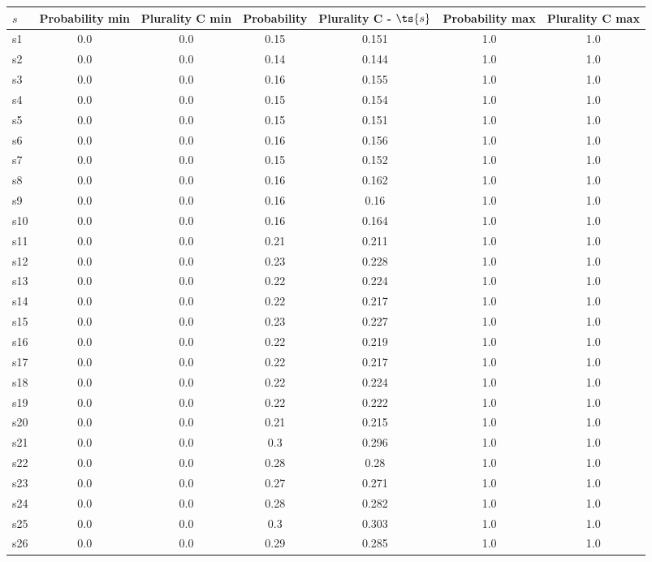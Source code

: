 \documentclass{article}
\begin{document}
\noindent\begin{tabular}{|l|c|c|c|c|c|c|}
\hline
$s$& Probability min & Plurality C min & Probability & Plurality C - $\ts{s}$ & Probability max & Plurality C max\\
\hline
s1 &0.0 & 0.0 & 0.15 & 0.151 & 1.0 & 1.0\\
\hline
s2 &0.0 & 0.0 & 0.14 & 0.144 & 1.0 & 1.0\\
\hline
s3 &0.0 & 0.0 & 0.16 & 0.155 & 1.0 & 1.0\\
\hline
s4 &0.0 & 0.0 & 0.15 & 0.154 & 1.0 & 1.0\\
\hline
s5 &0.0 & 0.0 & 0.15 & 0.151 & 1.0 & 1.0\\
\hline
s6 &0.0 & 0.0 & 0.16 & 0.156 & 1.0 & 1.0\\
\hline
s7 &0.0 & 0.0 & 0.15 & 0.152 & 1.0 & 1.0\\
\hline
s8 &0.0 & 0.0 & 0.16 & 0.162 & 1.0 & 1.0\\
\hline
s9 &0.0 & 0.0 & 0.16 & 0.16 & 1.0 & 1.0\\
\hline
s10 &0.0 & 0.0 & 0.16 & 0.164 & 1.0 & 1.0\\
\hline
s11 &0.0 & 0.0 & 0.21 & 0.211 & 1.0 & 1.0\\
\hline
s12 &0.0 & 0.0 & 0.23 & 0.228 & 1.0 & 1.0\\
\hline
s13 &0.0 & 0.0 & 0.22 & 0.224 & 1.0 & 1.0\\
\hline
s14 &0.0 & 0.0 & 0.22 & 0.217 & 1.0 & 1.0\\
\hline
s15 &0.0 & 0.0 & 0.23 & 0.227 & 1.0 & 1.0\\
\hline
s16 &0.0 & 0.0 & 0.22 & 0.219 & 1.0 & 1.0\\
\hline
s17 &0.0 & 0.0 & 0.22 & 0.217 & 1.0 & 1.0\\
\hline
s18 &0.0 & 0.0 & 0.22 & 0.224 & 1.0 & 1.0\\
\hline
s19 &0.0 & 0.0 & 0.22 & 0.222 & 1.0 & 1.0\\
\hline
s20 &0.0 & 0.0 & 0.21 & 0.215 & 1.0 & 1.0\\
\hline
s21 &0.0 & 0.0 & 0.3 & 0.296 & 1.0 & 1.0\\
\hline
s22 &0.0 & 0.0 & 0.28 & 0.28 & 1.0 & 1.0\\
\hline
s23 &0.0 & 0.0 & 0.27 & 0.271 & 1.0 & 1.0\\
\hline
s24 &0.0 & 0.0 & 0.28 & 0.282 & 1.0 & 1.0\\
\hline
s25 &0.0 & 0.0 & 0.3 & 0.303 & 1.0 & 1.0\\
\hline
s26 &0.0 & 0.0 & 0.29 & 0.285 & 1.0 & 1.0\\
\hline

\end{tabular}
\end{document}
